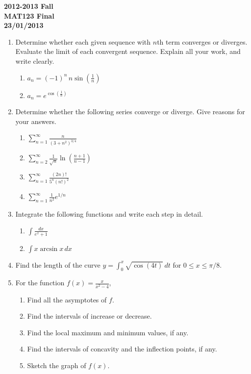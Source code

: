 \documentclass[a4paper, 12pt]{article}
\begin{document}
\pagestyle{empty}

\begin{center}
\textbf{2012-2013 Fall \\MAT123 Final\\23/01/2013}
\end{center}

\begin{enumerate}[leftmargin=*,label=\textbf{\arabic*.}]

\item Determine whether each given sequence with $n$th term converges or diverges. Evaluate the limit of each convergent sequence. Explain all your work, and write clearly.

\begin{enumerate}[leftmargin=*,label=\textbf{\alph*.}]
\item $\displaystyle a_n=(-1)^n\,n\sin\left(\frac1n\right)$
\item $\displaystyle a_n= e^{\cos\left(\textstyle\frac1n\right)}$
\end{enumerate}

\item Determine whether the following series converge or diverge. Give reasons for your answers.
\begin{enumerate}[leftmargin=*,label=\textbf{\alph*.}]
\item $\displaystyle\sum_{n=1}^\infty\frac n{\left(3+n^2\right)^{3/4}}$
\item $\displaystyle\sum_{n=2}^\infty\frac1{\sqrt n}\ln\left(\frac{n+1}{n-1}\right)$
\item $\displaystyle\sum_{n=1}^\infty\frac{(2n)!}{5^n\left(n!\right)^2}$
\item $\displaystyle\sum_{n=1}^\infty\frac1{n^2} e^{1/n}$
\end{enumerate}

\item Integrate the following functions and write each step in detail.
\begin{enumerate}[leftmargin=*,label=\textbf{\alph*.}]
\item $\displaystyle\int\frac{dx}{ e^x+1}$
\item $\displaystyle\int x\arcsin x\,dx$
\end{enumerate}

\item Find the length of the curve $\displaystyle y=\int_0^x\sqrt{\cos\left(4t\right)}\,dt$ for $0\leq x\leq \pi/8$.
\item For the function $\displaystyle f(x)=\frac x{x^2-4}$,
\begin{enumerate}[leftmargin=*,label=\textbf{\alph*.}]
\item Find all the asymptotes of $f$.
\item Find the intervals of increase or decrease.
\item Find the local maximum and minimum values, if any.
\item Find the intervals of concavity and the inflection points, if any.
\item Sketch the graph of $f(x)$.
\end{enumerate}
\end{enumerate}
\end{document}
